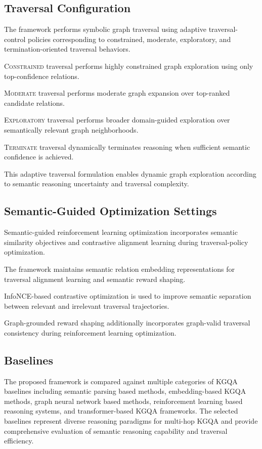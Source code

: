 \documentclass[10pt,conference]{IEEEtran}
\begin{document}
\subsection{Traversal Configuration}

The framework performs symbolic graph traversal using adaptive traversal-control policies corresponding to constrained, moderate, exploratory, and termination-oriented traversal behaviors.

\textsc{Constrained} traversal performs highly constrained graph exploration using only top-confidence relations.

\textsc{Moderate} traversal performs moderate graph expansion over top-ranked candidate relations.

\textsc{Exploratory} traversal performs broader domain-guided exploration over semantically relevant graph neighborhoods.

\textsc{Terminate} traversal dynamically terminates reasoning when sufficient semantic confidence is achieved.

This adaptive traversal formulation enables dynamic graph exploration according to semantic reasoning uncertainty and traversal complexity.

\subsection{Semantic-Guided Optimization Settings}

Semantic-guided reinforcement learning optimization incorporates semantic similarity objectives and contrastive alignment learning during traversal-policy optimization.

The framework maintains semantic relation embedding representations for traversal alignment learning and semantic reward shaping.

InfoNCE-based contrastive optimization is used to improve semantic separation between relevant and irrelevant traversal trajectories.

Graph-grounded reward shaping additionally incorporates graph-valid traversal consistency during reinforcement learning optimization.

\subsection{Baselines}

The proposed framework is compared against multiple categories of KGQA baselines including semantic parsing based methods, embedding-based KGQA methods, graph neural network based methods, reinforcement learning based reasoning systems, and transformer-based KGQA frameworks. The selected baselines represent diverse reasoning paradigms for multi-hop KGQA and provide comprehensive evaluation of semantic reasoning capability and traversal efficiency.
\end{document}
